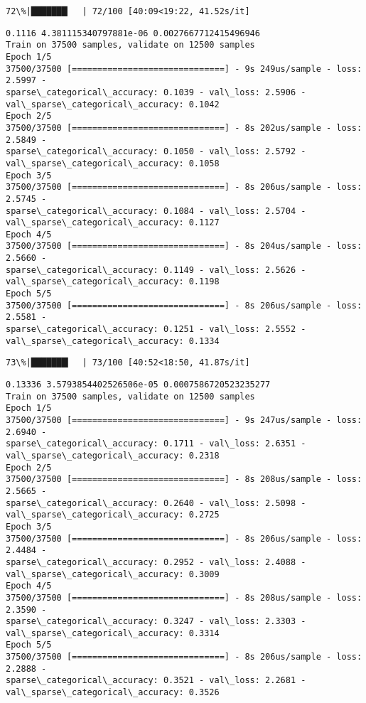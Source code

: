 \documentclass[11pt]{article}
\begin{document}
    \begin{Verbatim}[commandchars=\\\{\}]
 72\%|███████▏  | 72/100 [40:09<19:22, 41.52s/it]
    \end{Verbatim}

    \begin{Verbatim}[commandchars=\\\{\}]
0.1116 4.381115340797881e-06 0.0027667712415496946
Train on 37500 samples, validate on 12500 samples
Epoch 1/5
37500/37500 [==============================] - 9s 249us/sample - loss: 2.5997 -
sparse\_categorical\_accuracy: 0.1039 - val\_loss: 2.5906 -
val\_sparse\_categorical\_accuracy: 0.1042
Epoch 2/5
37500/37500 [==============================] - 8s 202us/sample - loss: 2.5849 -
sparse\_categorical\_accuracy: 0.1050 - val\_loss: 2.5792 -
val\_sparse\_categorical\_accuracy: 0.1058
Epoch 3/5
37500/37500 [==============================] - 8s 206us/sample - loss: 2.5745 -
sparse\_categorical\_accuracy: 0.1084 - val\_loss: 2.5704 -
val\_sparse\_categorical\_accuracy: 0.1127
Epoch 4/5
37500/37500 [==============================] - 8s 204us/sample - loss: 2.5660 -
sparse\_categorical\_accuracy: 0.1149 - val\_loss: 2.5626 -
val\_sparse\_categorical\_accuracy: 0.1198
Epoch 5/5
37500/37500 [==============================] - 8s 206us/sample - loss: 2.5581 -
sparse\_categorical\_accuracy: 0.1251 - val\_loss: 2.5552 -
val\_sparse\_categorical\_accuracy: 0.1334
    \end{Verbatim}

    \begin{Verbatim}[commandchars=\\\{\}]
 73\%|███████▎  | 73/100 [40:52<18:50, 41.87s/it]
    \end{Verbatim}

    \begin{Verbatim}[commandchars=\\\{\}]
0.13336 3.5793854402526506e-05 0.0007586720523235277
Train on 37500 samples, validate on 12500 samples
Epoch 1/5
37500/37500 [==============================] - 9s 247us/sample - loss: 2.6940 -
sparse\_categorical\_accuracy: 0.1711 - val\_loss: 2.6351 -
val\_sparse\_categorical\_accuracy: 0.2318
Epoch 2/5
37500/37500 [==============================] - 8s 208us/sample - loss: 2.5665 -
sparse\_categorical\_accuracy: 0.2640 - val\_loss: 2.5098 -
val\_sparse\_categorical\_accuracy: 0.2725
Epoch 3/5
37500/37500 [==============================] - 8s 206us/sample - loss: 2.4484 -
sparse\_categorical\_accuracy: 0.2952 - val\_loss: 2.4088 -
val\_sparse\_categorical\_accuracy: 0.3009
Epoch 4/5
37500/37500 [==============================] - 8s 208us/sample - loss: 2.3590 -
sparse\_categorical\_accuracy: 0.3247 - val\_loss: 2.3303 -
val\_sparse\_categorical\_accuracy: 0.3314
Epoch 5/5
37500/37500 [==============================] - 8s 206us/sample - loss: 2.2888 -
sparse\_categorical\_accuracy: 0.3521 - val\_loss: 2.2681 -
val\_sparse\_categorical\_accuracy: 0.3526
    \end{Verbatim}
\end{document}

